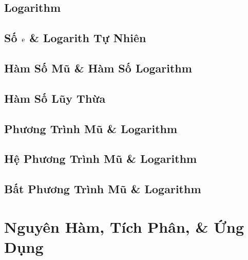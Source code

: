 \documentclass[oneside]{book}
\numberwithin{equation}{section}
\begin{document}
\section{Logarithm}


\section{Số $\rm e$ \& Logarith Tự Nhiên}


\section{Hàm Số Mũ \& Hàm Số Logarithm}


\section{Hàm Số Lũy Thừa}


\section{Phương Trình Mũ \& Logarithm}


\section{Hệ Phương Trình Mũ \& Logarithm}


\section{Bất Phương Trình Mũ \& Logarithm}


\chapter{Nguyên Hàm, Tích Phân, \& Ứng Dụng}
\end{document}
